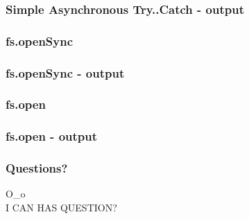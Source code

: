 \documentclass[16pt]{beamer}
\begin{document}
\begin{frame}[fragile]
  \frametitle{Simple Asynchronous Try..Catch - output}
  \begin{scriptsize}
    
  \end{scriptsize}
\end{frame}

\begin{frame}[fragile]
  \frametitle{fs.openSync}
  \begin{footnotesize}
    
  \end{footnotesize}
\end{frame}

\begin{frame}[fragile]
  \frametitle{fs.openSync - output}
  \begin{scriptsize}
    
  \end{scriptsize}
\end{frame}

\begin{frame}[fragile]
  \frametitle{fs.open}
  \begin{footnotesize}
    
  \end{footnotesize}
\end{frame}

\begin{frame}[fragile]
  \frametitle{fs.open - output}
  \begin{scriptsize}
    
  \end{scriptsize}
\end{frame}

\begin{frame}
  \frametitle{Questions?}
  \begin{center}
    O\_o\\
    \vspace{1cm}
    I CAN HAS QUESTION?
  \end{center}
\end{frame}
\end{document}
